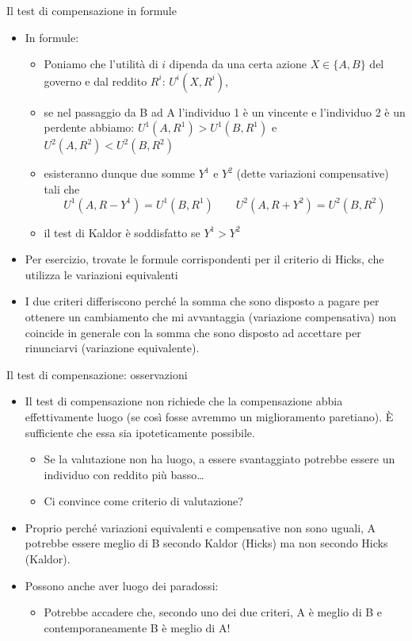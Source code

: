 \documentclass[aspectratio=64,12pt]{beamer}
\begin{document}
\begin{frame}{Il test di compensazione in formule}
\begin{itemize}
\item In formule:
\begin{itemize}
\item Poniamo che l’utilità di $i$ dipenda da una certa azione $X\in\{A, B\}$ del governo e dal
reddito $R^i$: $U^i(X, R^i)$,
\item se nel passaggio da B ad A l’individuo 1 è un vincente e l’individuo 2 è
un perdente abbiamo:
$U^1(A, R^1) > U^1(B, R^1)$ e $U^2(A, R^2) < U^2(B, R^2)$
\item esisteranno dunque due somme $Y^1$ e $Y^2$ (dette variazioni compensative) tali che
\begin{equation*}
U^1(A, R - Y^1) = U^1(B, R^1) \qquad U^2(A, R + Y^2) = U^2(B, R^2)
\end{equation*}
\item il test di Kaldor è soddisfatto se $Y^1 >  Y^2$
\end{itemize}
\item Per esercizio, trovate le formule corrispondenti per il criterio di Hicks, che utilizza le variazioni equivalenti
\item I due criteri differiscono perché la somma che sono disposto a pagare per ottenere un cambiamento che mi avvantaggia (variazione compensativa) non coincide in generale con la somma che sono disposto ad accettare per rinunciarvi (variazione equivalente).
\end{itemize}
\end{frame}

\begin{frame}{Il test di compensazione: osservazioni}
\begin{itemize}
\item Il test di compensazione non richiede che la compensazione abbia effettivamente luogo (se così fosse avremmo un miglioramento paretiano). È sufficiente che essa sia \alert{ipoteticamente} possibile.
\begin{itemize}
\item Se la valutazione non ha luogo, a essere svantaggiato potrebbe essere un individuo con reddito più basso\dots
\item Ci convince come criterio di valutazione?
\end{itemize}
\item Proprio perché variazioni equivalenti e compensative non sono uguali, A potrebbe essere meglio di B secondo Kaldor (Hicks) ma non secondo Hicks (Kaldor).
\item Possono anche aver luogo dei paradossi: 
\begin{itemize}
\item Potrebbe accadere che, secondo uno dei due criteri, A è meglio di B e contemporaneamente B è meglio di A!
\end{itemize}
\end{itemize}
\end{frame}
\end{document}
